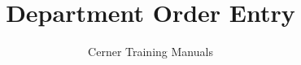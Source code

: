 

\renewcommand{\maketitlepage}[0]{%
  \cleardoublepage%
  {%
    \pagestyle{plain}%
    \sffamily%
    \begin{fullwidth}%
      \fontsize{18}{20}\selectfont\par\noindent\textcolor{darkgray}{\allcaps{\thanklessauthor}}%
      \vspace{11.5pc}%
      \fontsize{28}{29}\selectfont\par\noindent\textcolor{darkgray}{\allcaps{\thanklesstitle}}%
      \vfill%
      \fontsize{14}{16}\selectfont\par\noindent\allcaps{\thanklesspublisher}%
    \end{fullwidth}%
  }
}

\title{Department Order Entry} %
\author{Cerner Training Manuals}


\frontmatter
\maketitle %
\begin{fullwidth}
  \tableofcontents
\end{fullwidth}
\mainmatter


\backmatter
{}


